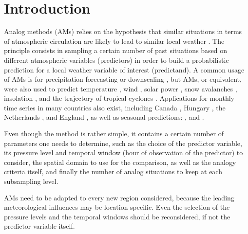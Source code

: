 \documentclass{ametsoc}
\begin{document}


\section{Introduction}
\label{section_intro}

Analog methods (AMs) relies on the hypothesis that similar situations in terms of atmospheric circulation are likely to lead to similar local weather \citep{Lorenz1956, Lorenz1969, Duband1970, Bontron2005}. The principle consists in sampling a certain number of past situations based on different atmospheric variables (predictors) in order to build a probabilistic prediction for a local weather variable of interest (predictand). A common usage of AMs is for precipitation forecasting or downscaling \citep[eg.][]{Guilbaud1997, Bontron2005, Hamill2006, Bliefernicht2010, Marty2012, Horton2012, Radanovics2013, Chardon2014, Dayon2015, Hamill2015b, BenDaoud2016}, but AMs, or equivalent, were also used to predict temperature \citep{Radinovic1975, Woodcock1980, Kruizinga1983, DelleMonache2013, Caillouet2016}, wind \citep{Gordon1987, DelleMonache2013, DelleMonache2011, Vanvyve2015, Alessandrini2015, Junk2015, Junk2015c}, solar power \citep{Alessandrini2015a, Bessa2015}, snow avalanches \citep{Obled1980, Bolognesi1993}, insolation \citep{Bois1981}, and the trajectory of tropical cyclones \citep{Keenan1981, Sievers2000, Fraedrich2003}. Applications for monthly time series in many countries also exist, including Canada \citep{Shabbar1986},  Hungary \citep{Toth1989}, the Netherlands \citep{Nap1981}, and England \citep{Murray1974}, as well as seasonal predictions: \citet{Barnett1978}, \citet{Bergen1982} and \citet{Livezey1988}.

Even though the method is rather simple, it contains a certain number of parameters one needs to determine, such as the choice of the predictor variable, its pressure level and temporal window (hour of observation of the predictor) to consider, the spatial domain to use for the comparison, as well as the analogy criteria itself, and finally the number of analog situations to keep at each subsampling level. 

AMs need to be adapted to every new region considered, because the leading meteorological influences may be location specific. Even the selection of the pressure levels and the temporal windows should be reconsidered, if not the predictor variable itself. 
\end{document}
